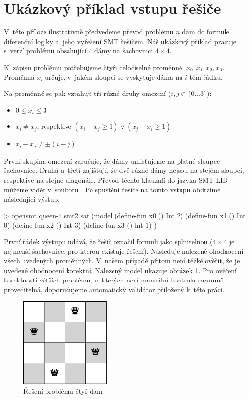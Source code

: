 \documentclass[12pt,a4paper]{report}
\let\openright=\clearpage
\begin{document}
\section{Ukázkový příklad vstupu řešiče}\label{priklad}

V~této příloze ilustrativně předvedeme převod problému $n$ dam do formule diferenční logiky a~jeho vyřešení SMT řešičem. Náš ukázkový příklad pracuje s~verzí problému obsahující 4 dámy na šachovnici $4\times 4$.

K~zápisu problému potřebujeme čtyři celočíselné proměnné, $x_0, x_1, x_2, x_3$. Proměnná $x_i$ určuje, v~jakém sloupci se vyskytuje dáma na $i$-tém řádku.

Na proměnné se pak vztahují tři různé druhy omezení ($i, j \in \{0\dots3\}$):
\begin{itemize}
	\item $0 \leq x_i \leq 3$
	\item $x_i \neq x_j$, respektive $(x_i - x_j \geq 1) \lor (x_j - x_i \geq 1)$
	\item $x_i - x_j \neq \pm(i-j)$.
\end{itemize}

První skupina omezení zaručuje, že dámy umisťujeme na platné sloupce šachovnice. Druhá a~třetí zajišťují, že dvě různé dámy nejsou na stejém sloupci, respektive na stejné diagonále. Převod těchto klauzulí do jazyka SMT-LIB můžeme vidět v~souboru . Po spuštění řešiče na tomto vstupu obdržíme následující výstup.
\begin{code}
> opensmt queen-4.smt2
sat
(model
(define-fun x0 () Int 2)
(define-fun x1 () Int 0)
(define-fun x2 () Int 3)
(define-fun x3 () Int 1)
)
\end{code}
První řádek výstupu udává, že řešič označil formuli jako splnitelnou ($4\times4$ je nejmenší šachovnice, pro kterou existuje řešení). Následuje nalezené ohodnocení všech uvedených proměnných. V~našem případě přitom není těžké ověřit, že je uvedené ohodnocení korektní. Nalezený model ukazuje obrázek \ref{fig:queens}. Pro ověření korektnosti větších problémů, u~kterých není manuální kontrola rozumně proveditelná, doporučujeme automatický validátor přiložený k~této práci. 

\begin{figure}[b]
	\centering
	\includegraphics[width=0.4\textwidth]{queens.pdf}
	\caption{Řešení problému čtyř dam}
	\label{fig:queens}
\end{figure}

\openright
\end{document}
